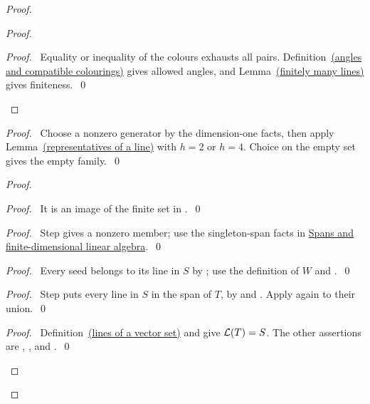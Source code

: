 \begin{mergedproofsection}
\begin{proof}
\begin{proof}
 \qedstep
 \begin{proof}\pf\ Equality or inequality of the colours exhausts all
 pairs. Definition~\hyperref[def:312-angles]{(angles and compatible colourings)} gives allowed angles, and
 Lemma~\hyperref[lem:312-finite]{(finitely many lines)} gives finiteness.~\qed\end{proof}
\end{proof}
\begin{proof}\pf\ Choose a nonzero generator by the dimension-one facts,
then apply Lemma~\hyperref[lem:312-representatives]{(representatives of a line)} with $h=2$ or $h=4$.
Choice on the empty set gives the empty family.~\qed\end{proof}
\begin{proof}
 \begin{proof}\pf\ It is an image of the finite set in .~\qed\end{proof}
 \begin{proof}\pf\ Step  gives a nonzero member;
 use the singleton-span facts in \hyperref[facts:312-linear]{Spans and finite-dimensional linear algebra}.~\qed\end{proof}
 \begin{proof}\pf\ Every seed belongs to its line in $S$ by
 ; use the definition of $W$ and .~\qed\end{proof}
 \begin{proof}\pf\ Step  puts every line in
 $S$ in the span of $T$, by 
 and . Apply 
 again to their union.~\qed\end{proof}
 \qedstep
 \begin{proof}\pf\ Definition~\hyperref[def:312-root-lines]{(lines of a vector set)} and
  give ${\mathcal L}(T)=S$. The other assertions are
 , , and
 .~\qed\end{proof}

\end{proof}
\end{proof}
\end{mergedproofsection}
